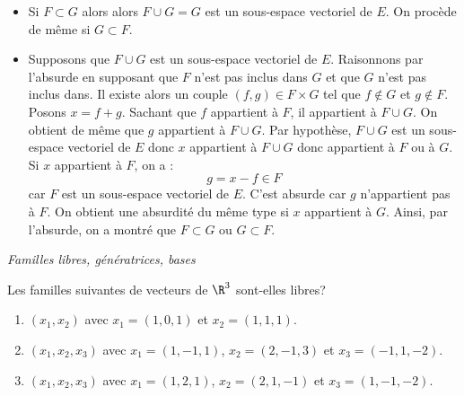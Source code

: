 \documentclass[a4paper,10pt]{report}
\begin{document}
\begin{itemize}
\item Si $F \subset G$ alors alors $F \cup G = G$ est un sous-espace vectoriel de $E$. On procède de même si $G \subset F$.
\item Supposons que $F \cup G$ est un sous-espace vectoriel de $E$. Raisonnons par l'absurde en supposant que $F$ n'est pas inclus dans $G$ et que $G$ n'est pas inclus dans. Il existe alors un couple $(f,g) \in F \times G$ tel que $f \notin G$ et $g \notin F$. Posons $x=f+g$. Sachant que $f$ appartient à $F$, il appartient à $F \cup G$. On obtient de même que $g$ appartient à $F \cup G$. Par hypothèse, $F \cup G$ est un sous-espace vectoriel de $E$ donc $x$ appartient à $F \cup G$ donc appartient à $F$ ou à $G$. Si $x$ appartient à $F$, on a :
$$ g = x-f \in F$$
car $F$ est un sous-espace vectoriel de $E$. C'est absurde car $g$ n'appartient pas à $F$. On obtient une absurdité du même type si $x$ appartient à $G$. Ainsi, par l'absurde, on a montré que $F \subset G$ ou $G \subset F$. 
\end{itemize}

\medskip

\begin{center}
\textit{{ {\large Familles libres, génératrices, bases}}}
\end{center}

\medskip

\begin{Exercice}{} Les familles suivantes de vecteurs de $\R^3$ sont-elles libres?
   \begin{enumerate}
  \item
        $(x_1 ,x_2)$ avec $x_1 = (1,0,1)$ et $x_2 = (1,1,1)$.
      \item
        $(x_1 ,x_2 ,x_3)$ avec $x_1 = (1, - 1,1)$, $x_2 = (2, - 1,3)$ et $x_3 = ( - 1,1, - 2)$.
      \item
        $(x_1 ,x_2 ,x_3)$ avec $x_1 = (1,2,1)$, $x_2 = (2,1, - 1)$ et $x_3 = (1, - 1, - 2)$.
    \end{enumerate}
\end{Exercice}

\corr 
\end{document}
